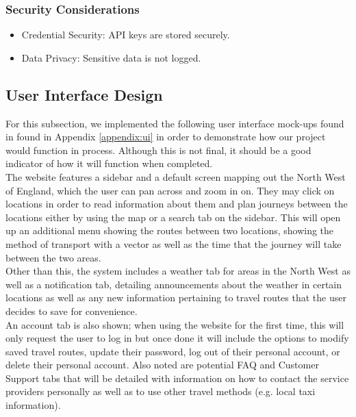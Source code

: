 \documentclass{article}
\begin{document}
\subsubsection{Security Considerations}
\begin{itemize}[label=--]
    \item Credential Security: API keys are stored securely.
    \item Data Privacy: Sensitive data is not logged.
\end{itemize}
    



\subsection{User Interface Design}
For this subsection, we implemented the following user interface mock-ups found in found in Appendix \ref{appendix:ui} in order to demonstrate how our project would function in process. Although this is not final, it should be a good indicator of how it will function when completed. \\

The website features a sidebar and a default screen mapping out the North West of England, which the user can pan across and zoom in on. They may click on locations in order to read information about them and plan journeys between the locations either by using the map or a search tab on the sidebar. This will open up an additional menu showing the routes between two locations, showing the method of transport with a vector as well as the time that the journey will take between the two areas. \\

Other than this, the system includes a weather tab for areas in the North West as well as a notification tab, detailing announcements about the weather in certain locations as well as any new information pertaining to travel routes that the user decides to save for convenience. \\

An account tab is also shown; when using the website for the first time, this will only request the user to log in but once done it will include the options to modify saved travel routes, update their password, log out of their personal account, or delete their personal account. Also noted are potential FAQ and Customer Support tabs that will be detailed with information on how to contact the service providers personally as well as to use other travel methods (e.g. local taxi information). 
\end{document}
